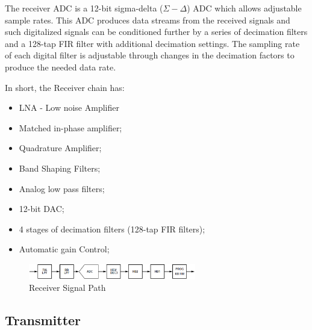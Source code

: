 The receiver ADC is a 12-bit sigma-delta ($\Sigma-\Delta$) ADC which allows adjustable sample rates. This ADC produces data streams from the received signals and such digitalized signals can be conditioned further by a series of decimation filters and a 128-tap FIR filter with additional decimation settings.
The sampling rate of each digital filter is adjustable through changes in the decimation factors to produce the needed data rate.

In short, the Receiver chain has:

\begin{itemize}
	\item LNA - Low noise Amplifier
	\item Matched in-phase amplifier;
	\item Quadrature Amplifier;
	\item Band Shaping Filters;
	\item Analog low pass filters;
	\item 12-bit DAC;
	\item 4 stages of decimation filters (128-tap FIR filters);
	\item Automatic gain Control;
\end{itemize}

\begin{figure}[htbp]
    \centering
    \includegraphics[width=0.65\textwidth]{./figures/rx_chain}
    \caption{ Receiver Signal Path
    \label{fig:rxchain}}
\end{figure}


\subsection{Transmitter}


